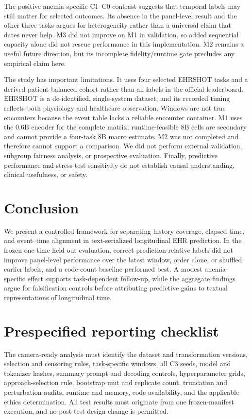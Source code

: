 \documentclass[pmlr,twocolumn,10pt]{jmlr}
\begin{document}
The positive anemia-specific C1--C0 contrast suggests that temporal labels may
still matter for selected outcomes. Its absence in the panel-level result and
the other three tasks argues for heterogeneity rather than a universal claim
that dates never help. M3 did not improve on M1 in validation, so added
sequential capacity alone did not rescue performance in this implementation.
M2 remains a useful future direction, but its incomplete fidelity/runtime gate
precludes any empirical claim here.

The study has important limitations. It uses four selected EHRSHOT tasks and a
derived patient-balanced cohort rather than all labels in the official
leaderboard. EHRSHOT is a de-identified, single-system dataset, and its recorded
timing reflects both physiology and healthcare observation. Windows are not
true encounters because the event table lacks a reliable encounter container.
M1 uses the 0.6B encoder for the complete matrix; runtime-feasible 8B cells are
secondary and cannot provide a four-task 8B macro estimate. M2 was not
completed and therefore cannot support a comparison. We did not perform
external validation, subgroup fairness analysis, or prospective evaluation.
Finally, predictive performance and stress-test sensitivity do not establish
causal understanding, clinical usefulness, or safety.

\section{Conclusion}
\label{sec:conclusion}

We present a controlled framework for separating history coverage, elapsed
time, and event--time alignment in text-serialized longitudinal EHR prediction.
In the frozen one-time held-out evaluation, correct prediction-relative labels
did not improve panel-level performance over the latest window, order alone, or
shuffled earlier labels, and a code-count baseline performed best. A modest
anemia-specific effect supports task-dependent follow-up, while the aggregate
findings argue for falsification controls before attributing predictive gains to
textual representations of longitudinal time.



\appendix

\section{Prespecified reporting checklist}

The camera-ready analysis must identify the dataset and transformation versions,
selection and censoring rules, task-specific windows, all C3 seeds, model and
tokenizer hashes, summary prompt and decoding controls, hyperparameter grids,
approach-selection rule, bootstrap unit and replicate count, truncation and
perturbation audits, runtime and memory, code availability, and the applicable
ethics determination. All test results must originate from one frozen-manifest
execution, and no post-test design change is permitted.
\end{document}
